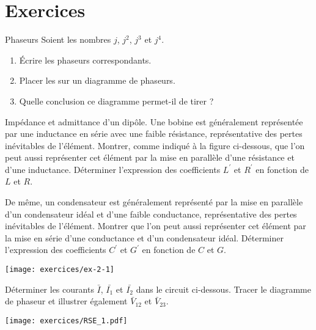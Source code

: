 
\section{Exercices}

\begin{exercise}{Phaseurs}
	\label{ex:phaseur_1} 
	Soient les nombres $j$, $j^2$, $j^3$ et $j^4$. 
	\begin{enumerate}
	\item Écrire les phaseurs correspondants. 
	\item Placer les sur un diagramme de phaseurs. 
	\item Quelle conclusion ce diagramme permet-il de tirer ?
	\end{enumerate}
\end{exercise}

\begin{exercise}{Impédance et admittance d'un dipôle.}\label{ex:RSE-1}
Une bobine est généralement représentée par une inductance en
série avec une faible résistance, représentative des pertes
inévitables de l'élément. Montrer, comme indiqué à la
figure ci-dessous, que l'on peut aussi repré\-sen\-ter cet élément par
la mise en parallèle d'une résistance et d'une inductance. Déterminer
l'expression des coefficients $L^{'}$ et $R^{'}$ en fonction de $L$ et
$R$.

De même, un condensateur est généralement représenté par la mise en
parallèle d'un condensateur idéal et d'une faible conductance,
représentative des pertes inévitables de l'élément. Montrer que l'on
peut aussi représenter cet élément par la mise en série d'une
conductance  et d'un condensateur idéal. Déterminer l'expression des
coefficients $C^{'}$ et $G^{'}$ en fonction de $C$ et $G$.
\begin{center}
\texttt{[image: exercices/ex-2-1]}
\end{center}

\end{exercise}

\begin{exercise}{}\label{ex:RSE_1} 
	Déterminer les courants $\bar{I}$, $\bar{I_1}$ et $\bar{I_2}$ dans le circuit ci-dessous.
	Tracer le diagramme de phaseur et illustrer également $\bar{V}_{12}$ et $\bar{V}_{23}$.
	\begin{center}
		\texttt{[image: exercices/RSE\_1.pdf]}
	\end{center}
\end{exercise}

